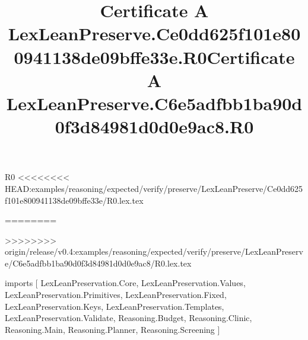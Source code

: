 \begin{lexlean}{R0}
<<<<<<<< HEAD:examples/reasoning/expected/verify/preserve/LexLeanPreserve/Ce0dd625f101e800941138de09bffe33e/R0.lex.tex
\title{Certificate A LexLeanPreserve.Ce0dd625f101e800941138de09bffe33e.R0}
========
\title{Certificate A LexLeanPreserve.C6e5adfbb1ba90d0f3d84981d0d0e9ac8.R0}
>>>>>>>> origin/release/v0.4:examples/reasoning/expected/verify/preserve/LexLeanPreserve/C6e5adfbb1ba90d0f3d84981d0d0e9ac8/R0.lex.tex
\begin{coremodule}
imports [
  LexLeanPreservation.Core,
  LexLeanPreservation.Values,
  LexLeanPreservation.Primitives,
  LexLeanPreservation.Fixed,
  LexLeanPreservation.Keys,
  LexLeanPreservation.Templates,
  LexLeanPreservation.Validate,
  Reasoning.Budget,
  Reasoning.Clinic,
  Reasoning.Main,
  Reasoning.Planner,
  Reasoning.Screening
]


\end{coremodule}
\end{lexlean}
